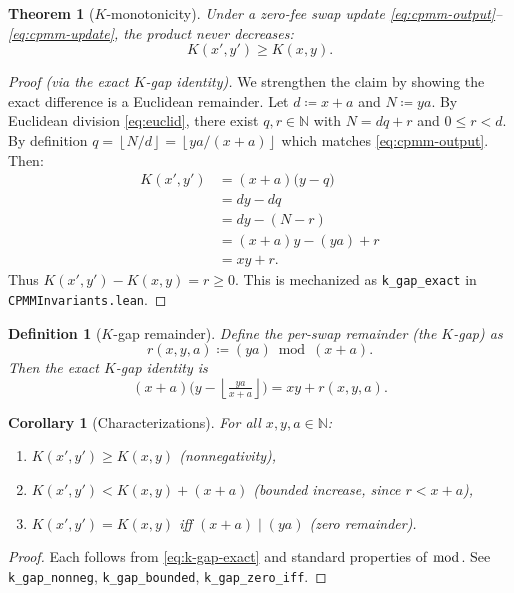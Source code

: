 \documentclass[11pt]{article}
\newtheorem{definition}{Definition}
\newtheorem{theorem}{Theorem}
\newtheorem{corollary}{Corollary}
\theoremstyle{remark}
\newcommand{\N}{\mathbb{N}}
\newcommand{\floor}[1]{\left\lfloor #1 \right\rfloor}
\begin{document}
\begin{theorem}[\texorpdfstring{$K$}{K}-monotonicity]
Under a zero-fee swap update \eqref{eq:cpmm-output}--\eqref{eq:cpmm-update}, the product never decreases:
\[
  K(x',y') \ge K(x,y).
\]
\end{theorem}
\begin{proof}[Proof (via the exact \texorpdfstring{$K$}{K}-gap identity)]
We strengthen the claim by showing the exact difference is a Euclidean remainder.
Let $d\coloneqq x+a$ and $N\coloneqq ya$.
By Euclidean division \eqref{eq:euclid}, there exist $q,r\in\N$ with $N=dq+r$ and $0\le r<d$.
By definition $q=\floor{N/d}=\floor{ya/(x+a)}$ which matches \eqref{eq:cpmm-output}.
Then:
\begin{align*}
  K(x',y') &= (x+a)\bigl(y - q\bigr) \\
           &= d y - d q \\
           &= d y - (N - r) \\
           &= (x+a)y - (ya) + r \\
           &= xy + r.
\end{align*}
Thus $K(x',y') - K(x,y)=r\ge 0$.
This is mechanized as \texttt{k\_gap\_exact} in \texttt{CPMMInvariants.lean}.
\end{proof}

\begin{definition}[\texorpdfstring{$K$}{K}-gap remainder]
Define the per-swap remainder (the \emph{$K$-gap}) as
\begin{equation}
  r(x,y,a) \coloneqq (y a) \bmod (x+a).
  \label{eq:k-gap}
\end{equation}
Then the exact $K$-gap identity is
\begin{equation}
  (x+a)\bigl(y - \floor{\tfrac{ya}{x+a}}\bigr) = xy + r(x,y,a).
  \label{eq:k-gap-exact}
\end{equation}
\end{definition}

\begin{corollary}[Characterizations]
For all $x,y,a\in\N$:
\begin{enumerate}[leftmargin=2em]
  \item $K(x',y')\ge K(x,y)$ (nonnegativity),
  \item $K(x',y') < K(x,y) + (x+a)$ (bounded increase, since $r<x+a$),
  \item $K(x',y') = K(x,y)$ iff $(x+a)\mid (ya)$ (zero remainder).
\end{enumerate}
\end{corollary}
\begin{proof}
Each follows from \eqref{eq:k-gap-exact} and standard properties of $\bmod$.
See \texttt{k\_gap\_nonneg}, \texttt{k\_gap\_bounded}, \texttt{k\_gap\_zero\_iff}.
\end{proof}
\end{document}
